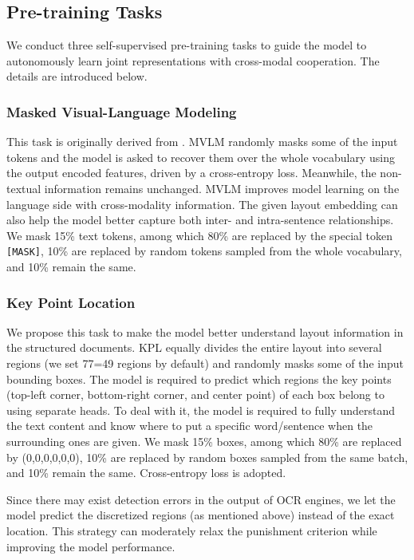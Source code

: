 \documentclass[11pt]{article}
\begin{document}
\subsection{Pre-training Tasks}
We conduct three self-supervised pre-training tasks to guide the model   to autonomously  learn  joint representations with  cross-modal cooperation. The details are introduced below.
\subsubsection{Masked Visual-Language Modeling}
This task is originally derived from  \cite{devlin2019bert}.
MVLM randomly masks some of the input tokens and the model is asked to recover them  over the whole vocabulary using the output encoded features, driven by a cross-entropy loss. 
Meanwhile, the non-textual information remains unchanged. MVLM improves model learning on the language side with cross-modality information. The given layout embedding can also help the model better capture both inter- and intra-sentence relationships. We mask 15\% text tokens, among which 80\% are replaced by the special token \texttt{[MASK]}, 10\% are replaced by  random tokens sampled from the whole vocabulary, and 10\% remain the same.

\subsubsection{Key Point Location}
We propose this  task to make the model better understand  layout information in the structured documents. KPL equally divides the entire layout into several regions (we set 77=49 regions by default)  and randomly masks some of the input bounding boxes. The model is required to predict  which  regions the key points (top-left corner, bottom-right corner, and center point) of each box belong to using separate heads.  To deal with it, the model is required to fully understand the text content and know where to put a specific word/sentence when the surrounding ones are given.  We mask 15\% boxes, among which 80\% are replaced by (0,0,0,0,0,0), 10\% are replaced by random boxes sampled from the same batch, and 10\% remain the same. Cross-entropy loss is adopted.

Since there may exist detection errors in the output of OCR engines, we let the model predict the discretized regions (as mentioned above) instead of the exact location. This strategy can moderately relax the punishment criterion while improving the model performance.
\end{document}
